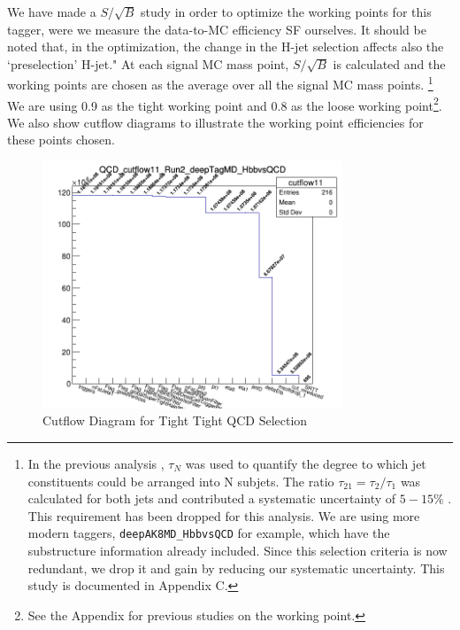 We have made a $S/\sqrt{B}$ study in order to optimize the working points for this tagger, were we measure the data-to-MC efficiency SF ourselves. It should be noted that, in the optimization, the change in the H-jet selection affects also the `preselection' H-jet." At each signal MC mass point, $S/\sqrt{B}$ is calculated and the working points are chosen as the average over all the signal MC mass points. \footnote{In the previous analysis \cite{CMS-PAS-B2G-16-026}, $\tau_N$ was used to quantify the degree to which jet constituents could be arranged into N subjets. The ratio $\tau_{21} = \tau_2 / \tau_1$ was calculated for both jets and contributed a systematic uncertainty of $5-15\%$ \cite{CMS-PAS-B2G-16-026}. This requirement has been dropped for this analysis. We are using more modern taggers, \texttt{deepAK8MD\_HbbvsQCD} \cite{CMS:2019gpd} for example, which have the substructure information already included. Since this selection criteria is now redundant, we drop it and gain by reducing our systematic uncertainty. This study is documented in Appendix C.} We are using 0.9 as the tight working point and 0.8 as the loose working point\footnote{See the Appendix for previous studies on the working point.}.
We also show cutflow diagrams to illustrate the working point efficiencies for these points chosen. 
\begin{figure}[!htb]
	\centering
	\includegraphics[width=0.8\textwidth]{Figures/QCD_cutflow11_Run2_deepTagMD_HbbvsQCD.png}
	\caption{Cutflow Diagram for Tight Tight QCD Selection}
	\label{fig:11CutflowqcdTT}
\end{figure}
